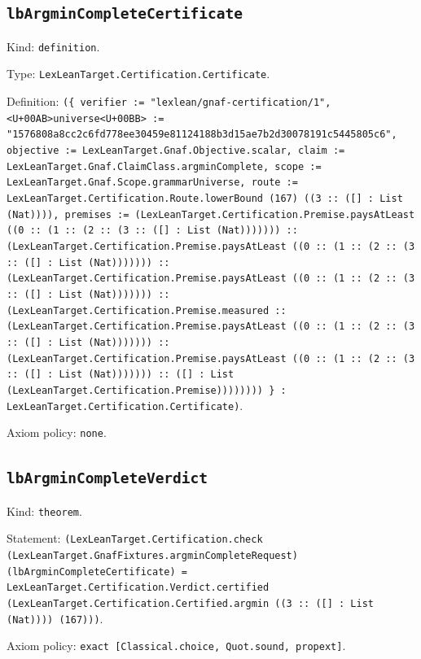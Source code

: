 \documentclass[11pt]{article}
\begin{document}
\subsection*{\texttt{lbArgminCompleteCertificate}}
\noindent Kind: \texttt{definition}.\par
\noindent Type: \texttt{LexLeanTarget.Certification.Certificate}.\par
\noindent Definition: \texttt{(\{ verifier := "lexlean/gnaf-certification/1", <U+00AB>universe<U+00BB> := "1576808a8cc2c6fd778ee30459e81124188b3d15ae7b2d30078191c5445805c6", objective := LexLeanTarget.Gnaf.Objective.scalar, claim := LexLeanTarget.Gnaf.ClaimClass.argminComplete, scope := LexLeanTarget.Gnaf.Scope.grammarUniverse, route := LexLeanTarget.Certification.Route.lowerBound (167) ((3 :: ([] : List (Nat)))), premises := (LexLeanTarget.Certification.Premise.paysAtLeast ((0 :: (1 :: (2 :: (3 :: ([] : List (Nat))))))) :: (LexLeanTarget.Certification.Premise.paysAtLeast ((0 :: (1 :: (2 :: (3 :: ([] : List (Nat))))))) :: (LexLeanTarget.Certification.Premise.paysAtLeast ((0 :: (1 :: (2 :: (3 :: ([] : List (Nat))))))) :: (LexLeanTarget.Certification.Premise.measured :: (LexLeanTarget.Certification.Premise.paysAtLeast ((0 :: (1 :: (2 :: (3 :: ([] : List (Nat))))))) :: (LexLeanTarget.Certification.Premise.paysAtLeast ((0 :: (1 :: (2 :: (3 :: ([] : List (Nat))))))) :: ([] : List (LexLeanTarget.Certification.Premise)))))))) \} : LexLeanTarget.Certification.Certificate)}.\par
\noindent Axiom policy: \texttt{none}.\par
\subsection*{\texttt{lbArgminCompleteVerdict}}
\noindent Kind: \texttt{theorem}.\par
\noindent Statement: \texttt{(LexLeanTarget.Certification.check (LexLeanTarget.GnafFixtures.argminCompleteRequest) (lbArgminCompleteCertificate) = LexLeanTarget.Certification.Verdict.certified (LexLeanTarget.Certification.Certified.argmin ((3 :: ([] : List (Nat)))) (167)))}.\par
\noindent Axiom policy: \texttt{exact [Classical.choice, Quot.sound, propext]}.\par
\end{document}

